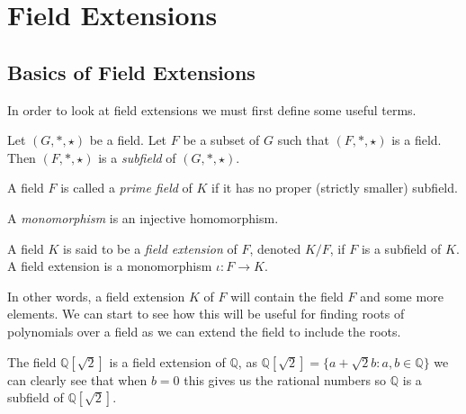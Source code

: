\section{Field Extensions}

\subsection{Basics of Field Extensions}
In order to look at field extensions we must first define some useful terms.
\begin{definition}
Let \((G, *,\star )\) be a field. Let \(F\) be a subset of \(G\) such that \((F,*,\star)\) is a field. Then \((F, *,\star)\) is a \textit{subfield}
 of \((G, *, \star)\).
\end{definition}
\begin{definition}
A field \(F\) is called a \textit{prime field} of \(K\) if it has no proper (strictly smaller) subfield.
\end{definition}
\begin{definition}
    A \textit{monomorphism} is an injective homomorphism.
\end{definition}

\begin{definition}
A field \(K\) is said to be a \textit{field extension} of \(F\), denoted \(K / F\), if \(F\) is a subfield of \(K\). \cite{Moy} A field extension is a monomorphism \(\iota: F \to K\).
\end{definition}
In other words, a field extension \(K\) of \(F\) will contain the field \(F\) and some more elements. We can start to see how this will be useful for finding roots of polynomials over a field as we can extend the field to include the roots.

\begin{example}
The field \(\mathbb{Q}[\sqrt{2}]\) is a field extension of \(\mathbb{Q}\), as \(\mathbb{Q}[\sqrt{2}] = \{a + \sqrt{2}b : a,b \in \mathbb{Q}\}\) we can clearly see that when \(b = 0\) this gives us the rational numbers so \(\mathbb{Q}\) is a subfield of \(\mathbb{Q}[\sqrt{2}]\).
\end{example}

